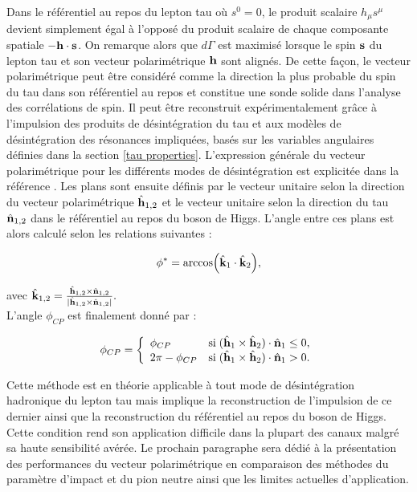 Dans le référentiel au repos du lepton tau où $s^0=0$, le produit scalaire $h_{\mu}s^{\mu}$ devient simplement égal à l'opposé du produit scalaire de chaque composante spatiale $-\vb{h}\cdot\vb{s}$. On remarque alors que $d\Gamma$ est maximisé lorsque le spin $\vb{s}$ du lepton tau et son vecteur polarimétrique $\vb{h}$ sont alignés. De cette façon, le vecteur polarimétrique peut être considéré comme la direction la plus probable du spin du tau dans son référentiel au repos et constitue une sonde solide dans l'analyse des corrélations de spin. Il peut être reconstruit expérimentalement grâce à l'impulsion des produits de désintégration du tau et aux modèles de désintégration des résonances impliquées, basés sur les variables angulaires définies dans la section \ref{tau properties}. L'expression générale du vecteur polarimétrique pour les différents modes de désintégration est explicitée dans la référence \cite{cherepanov2018methods}. Les plans sont ensuite définis par le vecteur unitaire selon la direction du vecteur polarimétrique $\hat{\vb{h}}_{1,2}$ et le vecteur unitaire selon la direction du tau $\hat{\vb{n}}_{1,2}$ dans le référentiel au repos du boson de Higgs. L'angle entre ces plans est alors calculé selon les relations suivantes :

\begin{equation}
\phi^*=\arccos(\hat{\vb{k}}_1\cdot\hat{\vb{k}}_2), 
\end{equation}

avec $\hat{\vb{k}}_{1,2}=\frac{\hat{\vb{h}}_{1,2}\times\hat{\vb{n}}_{1,2}}{|\hat{\vb{h}}_{1,2}\times\hat{\vb{n}}_{1,2}|}.$ \\

L'angle $\phi_{CP}$ est finalement donné par :

\begin{equation}
\phi_{CP}=
    \left\{
    \begin{array}{ll}
        \phi_{CP} & \mbox{si} \; (\hat{\vb{h}}_{1}\times\hat{\vb{h}}_{2})\cdot\hat{\vb{n}}_{1}\leq0, \\
        2\pi - \phi_{CP} & \mbox{si} \; (\hat{\vb{h}}_{1}\times\hat{\vb{h}}_{2})\cdot\hat{\vb{n}}_{1}>0.
    \end{array}
    \right.
\end{equation}

Cette méthode est en théorie applicable à tout mode de désintégration hadronique du lepton tau mais implique la reconstruction de l'impulsion de ce dernier ainsi que la reconstruction du référentiel au repos du boson de Higgs. Cette condition rend son application difficile dans la plupart des canaux malgré sa haute sensibilité avérée. Le prochain paragraphe sera dédié à la présentation des performances du vecteur polarimétrique en comparaison des méthodes du paramètre d'impact et du pion neutre ainsi que les limites actuelles d'application.

